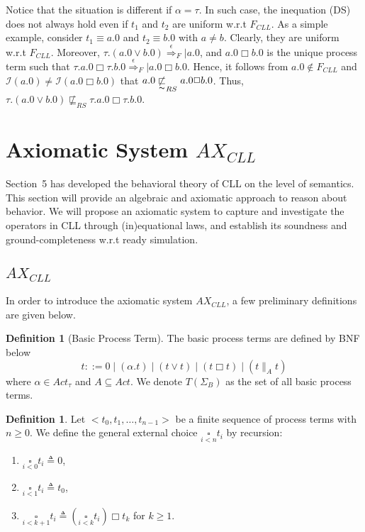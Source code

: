 \documentclass{elsarticle}
\theoremstyle{plain}
\theoremstyle{definition}
\newtheorem{mydefn}[theorem]{Definition}
\begin{document}
Notice that the situation is different if $\alpha = \tau$.
In such case, the inequation (DS) does not always hold even if $t_1$ and $t_2$ are  uniform w.r.t $F_{CLL}$.
As a simple example, consider $t_1\equiv a.0$ and $t_2\equiv b.0$ with $a \neq b$.
Clearly, they are uniform w.r.t $F_{CLL}$.
Moreover, $\tau.(a.0\vee b.0)\stackrel{\epsilon}{\Longrightarrow}_F|a.0$,  and $a.0 \Box b.0$ is the unique process term such that $\tau.a.0\Box \tau.b.0 \stackrel{\epsilon}{\Longrightarrow}_F|a.0\Box b.0$.
Hence, it follows from $a.0 \notin F_{CLL}$ and ${\mathcal I}(a.0)\neq {\mathcal I}(a.0\Box b.0)$ that $a.0 \not \underset{\thicksim}{\sqsubset}_{RS} a.0\Box b.0$.
Thus, $\tau.(a.0\vee b.0) \not\sqsubseteq_{RS} \tau.a.0 \Box \tau.b.0$.

\section{Axiomatic System $AX_{CLL}$}
Section~5 has developed the behavioral theory of CLL on the level of semantics. This section will provide an algebraic and axiomatic approach to reason about behavior.
We will propose an axiomatic system to capture and investigate the operators in CLL through (in)equational laws, and establish its soundness and ground-completeness w.r.t ready simulation.

\subsection{$AX_{CLL}$}
In order to introduce the axiomatic system $AX_{CLL}$, a few preliminary definitions are given below.


\begin{mydefn}[Basic Process Term] \label{D:BPT}
The basic process terms are defined by BNF below
\[t::=0\;|\;(\alpha.t)\;|\;(t\vee t)\;|\;(t \Box t)\;|\;(t\parallel_A t)\]
where $\alpha \in Act_{\tau}$ and $A \subseteq Act$. We denote $T(\Sigma_B)$ as the set of all basic process terms.
\end{mydefn}

\begin{mydefn}\label{D:GEC}
Let $<t_0,t_1,\dots,t_{n-1}>$ be a finite sequence of process terms with $n \geq 0$. We define the general external choice $\underset{i<n}\square t_i$ by recursion:
\begin{enumerate}
  \item $\underset{i<0}\square t_i \triangleq 0$,
  \item $\underset{i<1}\square t_i \triangleq t_0$,
  \item $\underset{i<k+1}\square t_i \triangleq (\underset{i<k}\square t_i) \Box t_k$ for $k \geq 1$.
\end{enumerate}
\end{mydefn}
\end{document}
